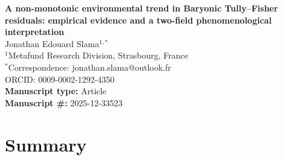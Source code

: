 \documentclass[11pt,a4paper]{article}
\begin{document}
\begin{center}
{\LARGE \textbf{A non-monotonic environmental trend in Baryonic Tully--Fisher residuals: empirical evidence and a two-field phenomenological interpretation}}\\[1cm]

{\large Jonathan Edouard Slama$^{1,*}$}\\[0.5cm]

$^{1}$Metafund Research Division, Strasbourg, France\\[0.3cm]
$^{*}$Correspondence: jonathan.slama@outlook.fr\\[0.3cm]
ORCID: 0009-0002-1292-4350\\[1cm]

\textbf{Manuscript type:} Article\\
\textbf{Manuscript \#:} 2025-12-33523\\[0.5cm]

\end{center}

\newpage


\section*{Summary}
\end{document}
